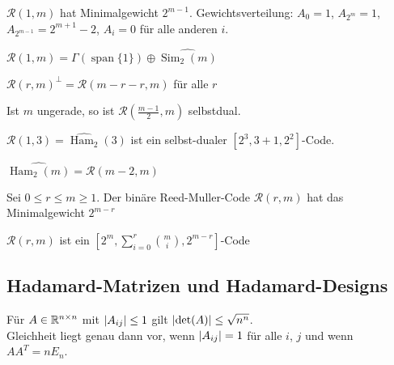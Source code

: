 \documentclass{cheat-sheet}
\DeclareMathOperator{\spann}{span} %
\DeclareMathOperator{\Ham}{Ham} %
\DeclareMathOperator{\Sim}{Sim} %
\newcommand{\RM}{\mathcal{R}} %
\newcommand{\PCE}[1]{\widehat{#1}} %
\begin{document}
\begin{satz}
  $\RM(1, m)$ hat Minimalgewicht $2^{m-1}$.
  Gewichtsverteilung: $A_0 = 1$, $A_{2^m} = 1$, $A_{2^{m-1}} = 2^{m+1} - 2$, $A_i = 0$ für alle anderen $i$.
\end{satz}


\begin{bem}
  $\RM(1, m) = \Gamma(\spann \{ 1 \}) \oplus \widehat{\Sim_2(m)}$
\end{bem}

\begin{satz}
  $\RM(r, m)^\perp = \RM(m - r - r, m)$ für alle $r$
\end{satz}

\begin{kor}
  Ist $m$ ungerade, so ist $\RM(\tfrac{m-1}{2}, m)$ selbstdual.
\end{kor}


\begin{bsp}
  $\RM(1, 3) = \PCE{\Ham_2}(3)$ ist ein selbst-dualer $[2^3, 3 + 1, 2^2]$-Code.
\end{bsp}

\begin{lem}
  $\PCE{\Ham_2(m)} = \RM(m-2, m)$
\end{lem}

\begin{satz}
  Sei $0 \leq r \leq m \geq 1$. Der binäre Reed-Muller-Code $\RM(r, m)$ hat das Minimalgewicht $2^{m-r}$
\end{satz}

\begin{kor}
   $\RM(r, m)$ ist ein $[2^m, \sum_{i=0}^r \binom{m}{i}, 2^{m-r}]$-Code
\end{kor}

\subsection{Hadamard-Matrizen und Hadamard-Designs}

\begin{satz}
  Für $A \in \mathbb{R}^{n \times n}$ mit $\lvert A_{ij}\rvert \leq 1$ gilt $\lvert\det(A)\rvert \leq \sqrt{n^n}$. \\
  Gleichheit liegt genau dann vor, wenn $\lvert A_{ij}\rvert = 1$ für alle $i$, $j$ und wenn $A A^T = n E_n$.
\end{satz}
\end{document}
